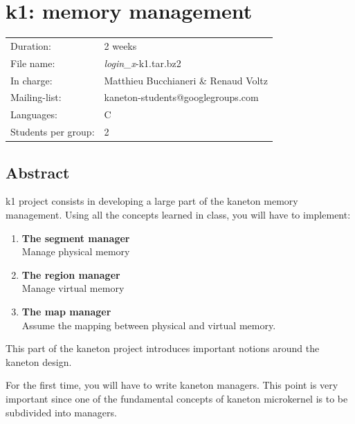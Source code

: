
%
%

\chapter{k1: memory management}

%
%

\begin{tabular}{p{7cm}l}
Duration: & 2 weeks \\
File name: & {\em login\_x}-k1.tar.bz2 \\
In charge: & Matthieu Bucchianeri \& Renaud Voltz\\
Mailing-list: & kaneton-students@googlegroups.com \\
Languages: & C \\
Students per group: & 2 \\
\end{tabular}

\section{Abstract}

k1 project consists in developing a large part of the kaneton memory management. Using all the concepts learned in class, you will have to implement:

\begin{enumerate}
  \item
    {\bf The segment manager}\\
    Manage physical memory
  \item
    {\bf The region manager}\\
    Manage virtual memory
  \item
    {\bf The map manager}\\
    Assume the mapping between physical and virtual memory.\\
\end{enumerate}

This part of the kaneton project introduces important notions around the
kaneton design.

For the first time, you will have to write kaneton managers. This point is
very important since one of the fundamental concepts of kaneton microkernel
is to be subdivided into managers.

